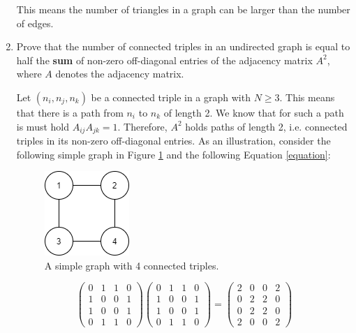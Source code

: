 \begin{enumerate}
	This means the number of triangles in a graph can be larger than the number of edges.
	
	\item Prove that the number of connected triples in an undirected graph is equal to half the \textbf{sum} of non-zero off-diagonal entries of the adjacency matrix $A^2$, where $A$ denotes the adjacency matrix.
	
	Let $(n_i, n_j, n_k)$ be a connected triple in a graph with $N \ge 3$. This means that there is a path from $n_i$ to $n_k$ of length 2. We know that for such a path is must hold $A_{ij}A_{jk} = 1$. Therefore, $A^2$ holds paths of length 2, i.e. connected triples in its non-zero off-diagonal entries. As an illustration, consider the following simple graph in Figure \ref{triples} and the following Equation \ref{equation}:
	
	\begin{figure}[h]
		\centering
		\includegraphics[width=0.25\linewidth]{images/triples.png}
		\caption{A simple graph with 4 connected triples.}
		\label{triples}
	\end{figure}
	
	\begin{equation*} \label{equation}
		\begin{pmatrix}
			0 & 1 & 1 & 0\\
			1 & 0 & 0 & 1\\
			1 & 0 & 0 & 1\\
			0 & 1 & 1 & 0
		\end{pmatrix}
		\begin{pmatrix}
			0 & 1 & 1 & 0\\
			1 & 0 & 0 & 1\\
			1 & 0 & 0 & 1\\
			0 & 1 & 1 & 0
		\end{pmatrix} = 
		\begin{pmatrix}
			2 & 0 & 0 & 2\\
			0 & 2 & 2 & 0\\
			0 & 2 & 2 & 0\\
			2 & 0 & 0 & 2
		\end{pmatrix}
	\end{equation*}


\end{enumerate}
